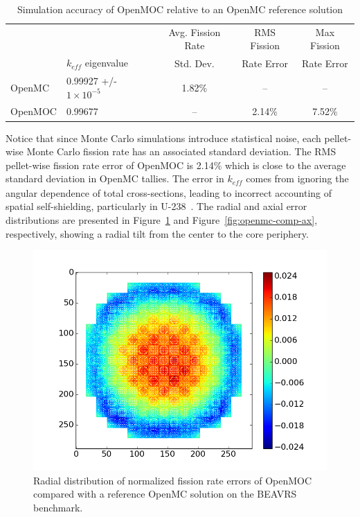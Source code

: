 \begin{table}[ht]
	\centering
	\caption{Simulation accuracy of OpenMOC relative to an OpenMC reference solution}
	\medskip
	\begin{tabular}{l|l|c|c|c}
		&                               & Avg. Fission Rate & \ac{RMS} Fission & Max Fission \\
		& $k_{\textit{eff}}$ eigenvalue & Std. Dev.         & Rate Error & Rate Error \\
		\hline
		OpenMC  & 0.99927 +/- $1 \times 10^{-5}$  & 1.82\% & --     & -- \\
		OpenMOC & 0.99677                         & --     & 2.14\% & 7.52\% \\
		\hline
	\end{tabular}
	\label{tab:openmc-comparison}
\end{table}

Notice that since Monte Carlo simulations introduce statistical noise, each pellet-wise Monte Carlo fission rate has an associated standard deviation. The \ac{RMS} pellet-wise fission rate error of OpenMOC is 2.14\% which is close to the average standard deviation in OpenMC tallies. The error in $k_{\textit{eff}}$ comes from ignoring the angular dependence of total cross-sections, leading to incorrect accounting of spatial self-shielding, particularly in U-238~\cite{gibson-preprint, guillaume}. The radial and axial error distributions are presented in Figure~\ref{fig:openmc-comp-rad} and Figure~\ref{fig:openmc-comp-ax}, respectively, showing a radial tilt from the center to the core periphery.

\begin{figure}[ht!]
	\centering
	\includegraphics[width=0.8\linewidth]{figures/results/full-core/radial_diff_v_openmc.png}
	\caption{Radial distribution of normalized fission rate errors of OpenMOC compared with a reference OpenMC solution on the BEAVRS benchmark.}
	\label{fig:openmc-comp-rad}
\end{figure}

